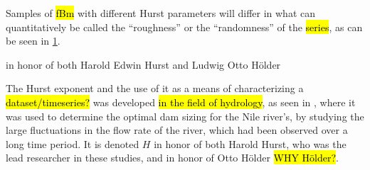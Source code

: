 Samples of \hl{fBm} with different Hurst parameters will differ in what can quantitatively be called the ``roughness'' or the ``randomness'' of the \hl{series}, as can be seen in \cref{fig:fBm_examples}.

in honor of both Harold Edwin Hurst and Ludwig Otto H\"older

The Hurst exponent and the use of it as a means of characterizing a \hl{dataset/timeseries?} was developed \hl{in the field of hydrology}, as seen in \cite{hurst1951longterm,hurst1965longterm}, where it was used to determine the optimal dam sizing for the Nile river's, by studying the large fluctuations in the flow rate of the river, which had been observed over a long time period. It is denoted $H$ in honor of both Harold Hurst, who was the lead researcher in these studies, and in honor of Otto H\"older \hl{WHY H\"older?}.
%
%
%
%
\begin{figure}[htpb]%
    \centering%
    \caption{}%
    \label{fig:fBm_examples}%
\end{figure}%
%
%
%
%
%
